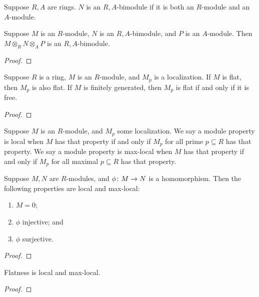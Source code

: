 \begin{definition}
    Suppose \(R,A\) are rings.
    \(N\) is an \(R,A\)-bimodule if it is both an \(R\)-module and an \(A\)-module.
\end{definition}
\begin{proposition}
    Suppose \(M\) is an \(R\)-module,
    \(N\) is an \(R,A\)-bimodule,
    and \(P\) is an \(A\)-module.
    Then \(M \otimes_R N \otimes_A P\) is an \(R,A\)-bimodule.
\end{proposition}
\begin{proof}
    
\end{proof}

\begin{proposition}
    Suppose \(R\) is a ring, \(M\) is an \(R\)-module,
    and \(M_p\) is a localization.
    If \(M\) is flat, then \(M_p\) is also flat.
    If \(M\) is finitely generated, then \(M_p\) is flat if and only if it is free.
\end{proposition}
\begin{proof}
    
\end{proof}
\begin{definition}
    Suppose \(M\) is an \(R\)-module, and \(M_p\) some localization.
    We say a module property is local when
    \(M\) has that property if and only if \(M_p\) for all prime \(p \subseteq R\) has that property.
    We say a module property is max-local when
    \(M\) has that property if and only if \(M_p\) for all maximal \(p \subseteq R\) has that property.
\end{definition}
\begin{lemma}
    Suppose \(M,N\) are \(R\)-modules, and \(\phi\colon M\to N\) is a homomorphism.
    Then the following properties are local and max-local:
    \begin{enumerate}[label={(\alph*)}, itemsep=0mm]
        \item \(M = 0\);
        \item \(\phi\) injective; and
        \item \(\phi\) surjective.
    \end{enumerate}
\end{lemma}
\begin{proof}
    
\end{proof}
\begin{theorem}
    Flatness is local and max-local.
\end{theorem}
\begin{proof}
    
\end{proof}


